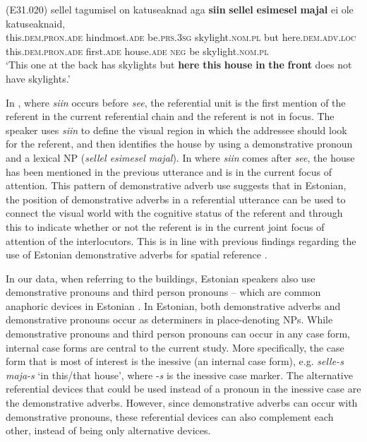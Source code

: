 \documentclass[output=paper,colorlinks,citecolor=brown]{langscibook}
\begin{document}
\ea\label{ex:nahkola:8} (E31.020)
\gll sellel tagumisel on katuseaknad aga \textbf{siin} \textbf{sellel} \textbf{esimesel} \textbf{majal} ei ole katuseaknaid,\\
     this.\textsc{dem.pron.ade} hindmost.\textsc{ade} be.\textsc{prs.3sg} skylight.\textsc{nom.pl} but here.\textsc{dem.adv.loc} this.\textsc{dem.pron.ade} first.\textsc{ade} house.\textsc{ade} \textsc{neg} be skylight.\textsc{nom.pl}\\
\glt ‘This one at the back has skylights but \textbf{here} \textbf{this} \textbf{house} \textbf{in} \textbf{the} \textbf{front} does not have skylights.’ 
\z

In , where \textit{siin} occurs before \textit{see}, the referential unit is the first mention of the referent in the current referential chain and the referent is not in focus. The speaker uses \textit{siin} to define the visual region in which the addressee should look for the referent, and then identifies the house by using a demonstrative pronoun and a lexical NP (\textit{sellel esimesel majal}). In  where\textit{ siin} comes after \textit{see}, the house has been mentioned in the previous utterance and is in the current focus of attention. This pattern of demonstrative adverb use suggests that in Estonian, the position of demonstrative adverbs in a referential utterance can be used to connect the visual world with the cognitive status of the referent and through this to indicate whether or not the referent is in the current joint focus of attention of the interlocutors. This is in line with previous findings regarding the use of Estonian demonstrative adverbs for spatial reference \citep{Reile2015,Reile2016}.

In our data, when referring to the buildings, Estonian speakers also use demonstrative pronouns and third person pronouns – which are common anaphoric devices in Estonian \citep{Pajusalu2009}. In Estonian, both demonstrative adverbs and demonstrative pronouns occur as determiners in place-denoting NPs. While demonstrative pronouns and third person pronouns can occur in any case form, internal case forms are central to the current study. More specifically, the case form that is most of interest is the inessive (an internal case form), e.g. \textit{selle-s maja-s} ‘in this/that house’, where -\textit{s} is the inessive case marker. The alternative referential devices that could be used instead of a pronoun in the inessive case are the demonstrative adverbs. However, since demonstrative adverbs can occur with demonstrative pronouns, these referential devices can also complement each other, instead of being only alternative devices.
\end{document}
